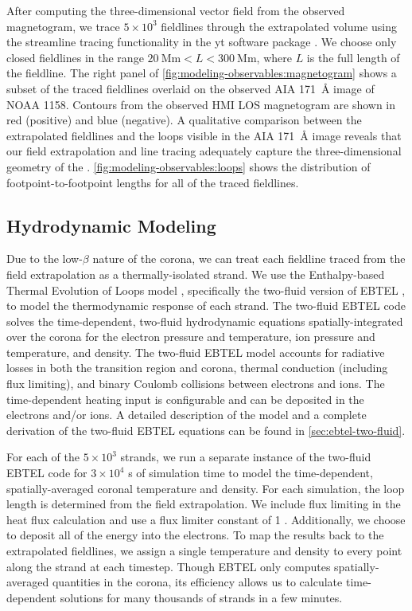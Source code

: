 After computing the three-dimensional vector field from the observed magnetogram, we trace $5\times10^3$ fieldlines through the extrapolated volume using the streamline tracing functionality in the yt software package \citep{turk_yt_2011}. We choose only closed fieldlines in the range $\SI{20}{\mega\m}<L<\SI{300}{\mega\m}$, where $L$ is the full length of the fieldline. The right panel of \autoref{fig:modeling-observables:magnetogram} shows a subset of the traced fieldlines overlaid on the observed AIA \SI{171}{\angstrom} image of NOAA 1158. Contours from the observed HMI LOS magnetogram are shown in red (positive) and blue (negative). A qualitative comparison between the extrapolated fieldlines and the loops visible in the AIA \SI{171}{\angstrom} image reveals that our field extrapolation and line tracing adequately capture the three-dimensional geometry of the \AR{}. \autoref{fig:modeling-observables:loops} shows the distribution of footpoint-to-footpoint lengths for all of the traced fieldlines.

\subsection{Hydrodynamic Modeling}\label{sec:modeling-observables:loops}

Due to the low-$\beta$ nature of the corona, we can treat each fieldline traced from the field extrapolation as a thermally-isolated strand. We use the Enthalpy-based Thermal Evolution of Loops model \citep[EBTEL,][]{klimchuk_highly_2008,cargill_enthalpy-based_2012,cargill_enthalpy-based_2012-1}, specifically the two-fluid version of EBTEL \citep{barnes_inference_2016}, to model the thermodynamic response of each strand. The two-fluid EBTEL code solves the time-dependent, two-fluid hydrodynamic equations spatially-integrated over the corona for the electron pressure and temperature, ion pressure and temperature, and density. The two-fluid EBTEL model accounts for radiative losses in both the transition region and corona, thermal conduction (including flux limiting), and binary Coulomb collisions between electrons and ions. The time-dependent heating input is configurable and can be deposited in the electrons and/or ions. A detailed description of the model and a complete derivation of the two-fluid EBTEL equations can be found in \autoref{sec:ebtel-two-fluid}.

For each of the $5\times10^3$ strands, we run a separate instance of the two-fluid EBTEL code for $3\times10^4$ s of simulation time to model the time-dependent, spatially-averaged coronal temperature and density. For each simulation, the loop length is determined from the field extrapolation. We include flux limiting in the heat flux calculation and use a flux limiter constant of 1 \citep[see Eqs. 21 and 22 of][]{klimchuk_highly_2008}. Additionally, we choose to deposit all of the energy into the electrons. To map the results back to the extrapolated fieldlines, we assign a single temperature and density to every point along the strand at each timestep. Though EBTEL only computes spatially-averaged quantities in the corona, its efficiency allows us to calculate time-dependent solutions for many thousands of strands in a few minutes.

